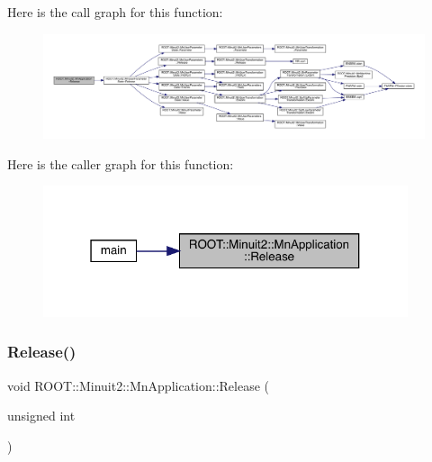 Here is the call graph for this function\+:
\nopagebreak
\begin{figure}[H]
\begin{center}
\leavevmode
\includegraphics[width=350pt]{df/dd5/classROOT_1_1Minuit2_1_1MnApplication_ab690313ed666d5a794a13b05054f5575_cgraph}
\end{center}
\end{figure}
Here is the caller graph for this function\+:
\nopagebreak
\begin{figure}[H]
\begin{center}
\leavevmode
\includegraphics[width=304pt]{df/dd5/classROOT_1_1Minuit2_1_1MnApplication_ab690313ed666d5a794a13b05054f5575_icgraph}
\end{center}
\end{figure}
\mbox{\label{classROOT_1_1Minuit2_1_1MnApplication_ab690313ed666d5a794a13b05054f5575}} 
\subsubsection{\texorpdfstring{Release()}{Release()}\hspace{0.1cm}{\footnotesize\ttfamily [2/6]}}
{\footnotesize\ttfamily void R\+O\+O\+T\+::\+Minuit2\+::\+Mn\+Application\+::\+Release (\begin{DoxyParamCaption}\item[{unsigned int}]{ }\end{DoxyParamCaption})}

\mbox{\label{classROOT_1_1Minuit2_1_1MnApplication_ab690313ed666d5a794a13b05054f5575}} 
